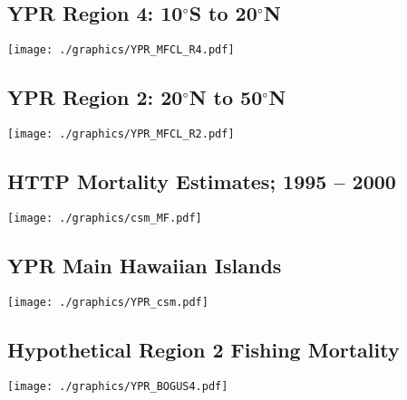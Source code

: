 \documentclass[a4paper,KOMA,landscape,titlepage]{powersem}
\renewcommand\deg[1]{$^\circ$#1}
\begin{document}
\begin{slide}\section{YPR Region 4: 10\deg{S} to 20\deg{N}}
\begin{center}
\texttt{[image: ./graphics/YPR\_MFCL\_R4.pdf]}
\end{center}
\end{slide}

\begin{slide}\section{YPR Region 2: 20\deg{N} to 50\deg{N}}
\begin{center}
\texttt{[image: ./graphics/YPR\_MFCL\_R2.pdf]}
\end{center}
\end{slide}

\begin{slide}\section{HTTP Mortality Estimates; 1995 -- 2000}
\begin{center}
\texttt{[image: ./graphics/csm\_MF.pdf]}
\end{center}
\end{slide}

\begin{slide}\section{YPR Main Hawaiian Islands}
\begin{center}
\texttt{[image: ./graphics/YPR\_csm.pdf]}
\end{center}
\end{slide}

\begin{slide}\section{Hypothetical Region 2 Fishing Mortality}
\begin{center}
\texttt{[image: ./graphics/YPR\_BOGUS4.pdf]}
\end{center}
\end{slide}
\end{document}
